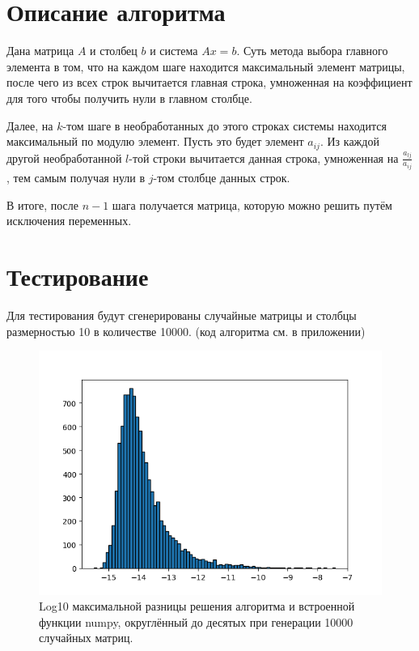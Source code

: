 \section{Описание алгоритма}
    Дана матрица $A$ и столбец $b$ и система $Ax = b$. Суть метода выбора главного элемента в том, что на каждом шаге находится максимальный элемент матрицы, после чего из всех строк вычитается главная строка, умноженная на коэффициент для того чтобы получить нули в главном столбце. 
    
    Далее, на $k$-том шаге в необработанных до этого строках системы находится максимальный по модулю элемент. Пусть это будет элемент $a_{ij}$. Из каждой другой необработанной $l$-той строки вычитается данная строка, умноженная на $\frac{a_{lj}}{a_{ij}}$, тем самым получая нули в $j$-том столбце данных строк.

    В итоге, после $n-1$ шага получается матрица, которую можно решить путём исключения переменных.

\pagebreak

\section{Тестирование}
    Для тестирования будут сгенерированы случайные матрицы и столбцы размерностью 10 в количестве 10000. (код алгоритма см. в приложении)

    \begin{figure}[H]
        \centering
        \includegraphics[width=16cm]{pictures/BarCounts.png}
        \caption{Log10 максимальной разницы решения алгоритма и встроенной функции numpy, округлённый до десятых при генерации 10000 случайных матриц.}
    \end{figure}


